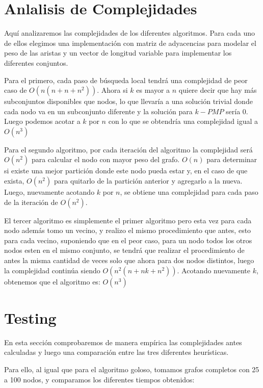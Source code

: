 \newpage

\section{Anlalisis de Complejidades}

Aquí analizaremos las complejidades de los diferentes algoritmos. Para cada uno de ellos elegimos una implementación con matriz de adyacencias para modelar el peso de las aristas y un vector de longitud variable para implementar los diferentes conjuntos.

Para el primero, cada paso de búsqueda local tendrá una complejidad de peor caso de $O(n(n + n + n^2))$. Ahora si $k$ es mayor a $n$ quiere decir que hay más subconjuntos disponibles que nodos, lo que llevaría a una solución trivial donde cada nodo va en un subconjunto diferente y la solución para $k-PMP$ sería 0.
Luego podemos acotar a $k$ por $n$ con lo que se obtendría una complejidad igual a $O(n^3)$

Para el segundo algoritmo, por cada iteración del algoritmo la complejidad será $O(n^2)$ para calcular el nodo con mayor peso del grafo. $O(n)$ para determinar si existe una mejor partición donde este nodo pueda estar y, en el caso de que exista, $O(n^2)$ para quitarlo de la partición anterior y agregarlo a la nueva. Luego, nuevamente acotando $k$ por $n$, se obtiene una complejidad para cada paso de la iteración de $O(n^2)$.

El tercer algoritmo es simplemente el primer algoritmo pero esta vez para cada nodo además tomo un vecino, y realizo el mismo procedimiento que antes, esto para cada vecino, suponiendo que en el peor caso, para un nodo todos los otros nodos esten en el mismo conjunto, se tendrá que realizar el procedimiento de antes la misma cantidad de veces solo que ahora para dos nodos distintos, luego la complejidad continúa siendo $O(n^2 (n + n k + n^2))$. Acotando nuevamente $k$, obtenemos que el algoritmo es: $O(n^3)$

\section{Testing}

En esta sección comprobaremos de manera empírica las complejidades antes calculadas y luego una comparación entre las tres diferentes heurísticas.

Para ello, al igual que para el algoritmo goloso, tomamos grafos completos con 25 a 100 nodos, y comparamos los diferentes tiempos obtenidos:

